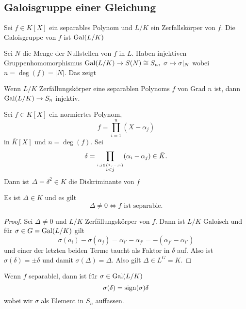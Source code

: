 \subsection{Galoisgruppe einer Gleichung}
\begin{Def}
    Sei \(f\in K[X]\) ein separables Polynom und \(L/K\) ein Zerfallskörper von \(f\). Die Galoisgruppe von \(f\) ist \(\operatorname{Gal}(L/K)\)
\end{Def}
\begin{Bem}
    Sei \(N\) die Menge der Nullstellen von \(f\) in \(L\).
    Haben injektiven Gruppenhomomorphismus \(\operatorname{Gal}(L/K)\to S(N)\cong S_n,\ \sigma\mapsto \sigma|_N\) wobei \(n=\deg(f)=|N|\). Das zeigt
\end{Bem}
\begin{Satz}
    Wenn \(L/K\) Zerfällungskörper eine separablen Polynoms \(f\) von Grad \(n\) ist, dann \(\operatorname{Gal}(L/K)\to S_n\) injektiv.
\end{Satz}
\begin{Def}[Diskriminante]
    Sei \(f\in K[X]\) ein normiertes Polynom, \[f=\prod_{i=1}^n(X-\alpha_j)\] in \(\bar K[X]\) und \(n=\deg(f)\). Sei 
    \[\delta=\prod_{\stackrel{i,j\in\{1,\dots,n\} }{i<j}}(\alpha_i-\alpha_j)\in\bar K.\]
    Dann ist \(\Delta=\delta^2\in\bar K\) die Diskriminante von \(f\)
\end{Def}
\begin{Lemma}
    Es ist \(\Delta\in K\) und es gilt  \[\Delta\neq 0\iff f \text{ ist separable.}\]
\end{Lemma}
\begin{proof}
    Sei \(\Delta\neq 0\) und \(L/K\) Zerfällungskörper von \(f\).
    Dann ist \(L/K\) Galoisch und für \(\sigma\in G=\operatorname{Gal}(L/K)\) gilt
    \[\sigma(a_i)-\sigma(\alpha_j)=\alpha_{i'}-\alpha_{j'}=-(\alpha_{j'}-\alpha_{i'})\] 
    und einer der letzten beiden Terme taucht als Faktor in \(\delta\) auf. Also ist \(\sigma(\delta)=\pm \delta\) und damit \(\sigma(\Delta)=\Delta\). Also gilt \(\Delta\in L^G=K\).
\end{proof}
\begin{Bem}
    Wenn \(f\) separablel, dann ist für \(\sigma\in\operatorname{Gal}(L/K)\) \[\sigma(\delta)=\operatorname{sign}(\sigma)\delta\] wobei wir \(\sigma\) als Element in \(S_n\) auffassen.
\end{Bem}
